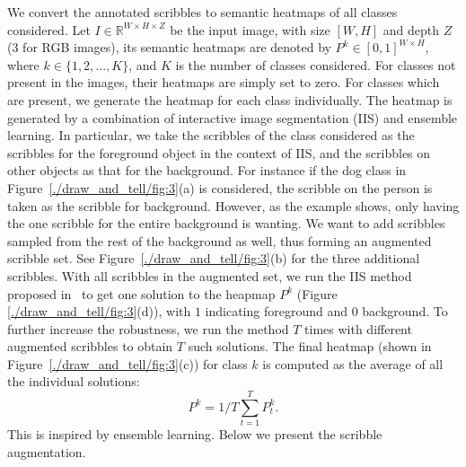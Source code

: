 We convert the annotated scribbles to semantic heatmaps of all classes
considered.  Let $I \in \mathbb{R}^{W \times H \times Z}$ be the input
image, with size $[W, H]$ and depth $Z$ (3 for RGB images), its
semantic heatmaps are denoted by $P^k \in [0,1]^{W \times H}$, where
$k \in \{1, 2, ...,K \}$, and $K$ is the number of classes
considered. For classes not present in the images, their heatmaps are
simply set to zero.  For classes which are present, we generate the
heatmap for each class individually. The heatmap is generated by a
combination of interactive image segmentation (IIS) and ensemble
learning.  In particular, we take the scribbles of the class
considered as the scribbles for the foreground object in the context
of IIS, and the scribbles on other objects as that for the
background. For instance if the dog class in
Figure~\ref{./draw_and_tell/fig:3}(a) is considered, the scribble on the
person is taken as the scribble for background.  However, as the
example shows, only having the one scribble for the entire background
is wanting.  We want to add scribbles sampled from the rest of the
background as well, thus forming an augmented scribble set. See
Figure~\ref{./draw_and_tell/fig:3}(b) for the three additional
scribbles. With all scribbles in the augmented set, we run the IIS
method proposed in~\citep{geodesic:star} to get one solution to the
heapmap $P^k$ (Figure \ref{./draw_and_tell/fig:3}(d)), with $1$
indicating foreground and $0$ background.
To further increase the robustness, we run the method
$T$ times with different augmented scribbles to obtain $T$ such
solutions. 
The final heatmap (shown in Figure~\ref{./draw_and_tell/fig:3}(c)) for class $k$ is
computed as the average of all the individual solutions:
\begin{equation}
  \label{eq:heatmap}
  P^k = 1/T \sum_{t=1}^T P^k_t.
\end{equation}
This is inspired by ensemble learning. Below we present the scribble augmentation.

